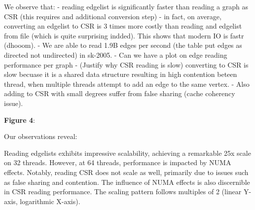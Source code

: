 We observe that:
- reading edgelist is significantly faster than reading a graph as CSR (this requires and additional conversion step)
- in fact, on average, converting an edgelist to CSR is 3 times more costly than reading and edgelist from file (which is quite surprising indded). This shows that modern IO is fastr (dhooom).
- We are able to read 1.9B edges per second (the table put edges as directed not undirected) in sk-2005.
- Can we have a plot on edge reading performance per graph
- (Justify why CSR reading is slow) converting to CSR is slow becuase it is a shared data structure resulting in high contention beteen thread, when multiple threads attempt to add an edge to the same vertex.
- Also adding to CSR with small degrees suffer from false sharing (cache coherency issue).

\textbf{Figure 4}:



Our observations reveal:

Reading edgelists exhibits impressive scalability, achieving a remarkable 25x scale on 32 threads.
However, at 64 threads, performance is impacted by NUMA effects.
Notably, reading CSR does not scale as well, primarily due to issues such as false sharing and contention.
The influence of NUMA effects is also discernible in CSR reading performance.
The scaling pattern follows multiples of 2 (linear Y-axis, logarithmic X-axis).

